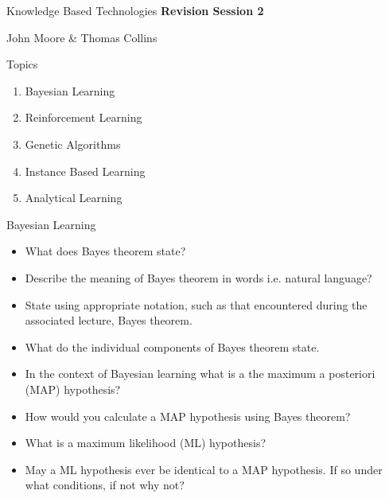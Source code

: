 \documentclass[%
pdf,
colorBG,
slideColor,
tcrico,
]{prosper}
\begin{document}
\begin{slide}{Knowledge Based Technologies}
	\textbf{Revision Session 2}

	\small
	John Moore \& Thomas Collins
\end{slide}

\begin{slide}{Topics} 

\begin{enumerate}
\item Bayesian Learning
\item Reinforcement Learning
\item Genetic Algorithms
\item Instance Based Learning	
\item Analytical Learning
\end{enumerate}
\end{slide}

\begin{slide}{Bayesian Learning} 
\tiny
\begin{itemize}
\item What does Bayes theorem state?
\item Describe the meaning of Bayes theorem in words i.e. natural language?
\item State using appropriate notation, such as that encountered during the associated lecture, Bayes theorem.
\item What do the individual components of Bayes theorem state.
\item In the context of Bayesian learning what is a the maximum a posteriori (MAP) hypothesis?
\item How would you calculate a MAP hypothesis using Bayes theorem?
\item What is a maximum likelihood (ML) hypothesis?
\item May a ML hypothesis ever be identical to a MAP hypothesis. If so under what conditions, if not why not?
\end{itemize}
\end{slide}
\end{document}
